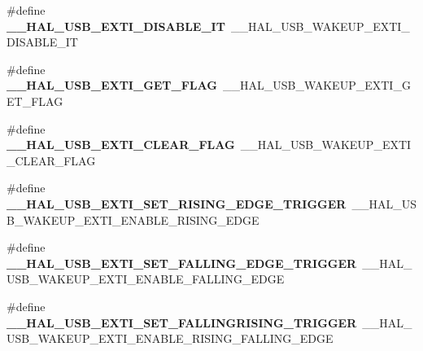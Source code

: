\begin{DoxyCompactItemize}
\item 
\#define {\bfseries \+\_\+\+\_\+\+H\+A\+L\+\_\+\+U\+S\+B\+\_\+\+E\+X\+T\+I\+\_\+\+D\+I\+S\+A\+B\+L\+E\+\_\+\+IT}~\+\_\+\+\_\+\+H\+A\+L\+\_\+\+U\+S\+B\+\_\+\+W\+A\+K\+E\+U\+P\+\_\+\+E\+X\+T\+I\+\_\+\+D\+I\+S\+A\+B\+L\+E\+\_\+\+IT\hypertarget{group___h_a_l___u_s_b___aliased___macros_ga9ae38cfb5026c3868e5d9e9325ab801c}{}\label{group___h_a_l___u_s_b___aliased___macros_ga9ae38cfb5026c3868e5d9e9325ab801c}

\item 
\#define {\bfseries \+\_\+\+\_\+\+H\+A\+L\+\_\+\+U\+S\+B\+\_\+\+E\+X\+T\+I\+\_\+\+G\+E\+T\+\_\+\+F\+L\+AG}~\+\_\+\+\_\+\+H\+A\+L\+\_\+\+U\+S\+B\+\_\+\+W\+A\+K\+E\+U\+P\+\_\+\+E\+X\+T\+I\+\_\+\+G\+E\+T\+\_\+\+F\+L\+AG\hypertarget{group___h_a_l___u_s_b___aliased___macros_ga6eac2b0cbade80df102638ce9eec5fff}{}\label{group___h_a_l___u_s_b___aliased___macros_ga6eac2b0cbade80df102638ce9eec5fff}

\item 
\#define {\bfseries \+\_\+\+\_\+\+H\+A\+L\+\_\+\+U\+S\+B\+\_\+\+E\+X\+T\+I\+\_\+\+C\+L\+E\+A\+R\+\_\+\+F\+L\+AG}~\+\_\+\+\_\+\+H\+A\+L\+\_\+\+U\+S\+B\+\_\+\+W\+A\+K\+E\+U\+P\+\_\+\+E\+X\+T\+I\+\_\+\+C\+L\+E\+A\+R\+\_\+\+F\+L\+AG\hypertarget{group___h_a_l___u_s_b___aliased___macros_gabaf7fe70f4008c0b9a81a0032b7b38fb}{}\label{group___h_a_l___u_s_b___aliased___macros_gabaf7fe70f4008c0b9a81a0032b7b38fb}

\item 
\#define {\bfseries \+\_\+\+\_\+\+H\+A\+L\+\_\+\+U\+S\+B\+\_\+\+E\+X\+T\+I\+\_\+\+S\+E\+T\+\_\+\+R\+I\+S\+I\+N\+G\+\_\+\+E\+D\+G\+E\+\_\+\+T\+R\+I\+G\+G\+ER}~\+\_\+\+\_\+\+H\+A\+L\+\_\+\+U\+S\+B\+\_\+\+W\+A\+K\+E\+U\+P\+\_\+\+E\+X\+T\+I\+\_\+\+E\+N\+A\+B\+L\+E\+\_\+\+R\+I\+S\+I\+N\+G\+\_\+\+E\+D\+GE\hypertarget{group___h_a_l___u_s_b___aliased___macros_gaef664a7c509860ae0f3a1abb427cf4f7}{}\label{group___h_a_l___u_s_b___aliased___macros_gaef664a7c509860ae0f3a1abb427cf4f7}

\item 
\#define {\bfseries \+\_\+\+\_\+\+H\+A\+L\+\_\+\+U\+S\+B\+\_\+\+E\+X\+T\+I\+\_\+\+S\+E\+T\+\_\+\+F\+A\+L\+L\+I\+N\+G\+\_\+\+E\+D\+G\+E\+\_\+\+T\+R\+I\+G\+G\+ER}~\+\_\+\+\_\+\+H\+A\+L\+\_\+\+U\+S\+B\+\_\+\+W\+A\+K\+E\+U\+P\+\_\+\+E\+X\+T\+I\+\_\+\+E\+N\+A\+B\+L\+E\+\_\+\+F\+A\+L\+L\+I\+N\+G\+\_\+\+E\+D\+GE\hypertarget{group___h_a_l___u_s_b___aliased___macros_ga852708fb3258bdc4b7d6b246d9ac32b9}{}\label{group___h_a_l___u_s_b___aliased___macros_ga852708fb3258bdc4b7d6b246d9ac32b9}

\item 
\#define {\bfseries \+\_\+\+\_\+\+H\+A\+L\+\_\+\+U\+S\+B\+\_\+\+E\+X\+T\+I\+\_\+\+S\+E\+T\+\_\+\+F\+A\+L\+L\+I\+N\+G\+R\+I\+S\+I\+N\+G\+\_\+\+T\+R\+I\+G\+G\+ER}~\+\_\+\+\_\+\+H\+A\+L\+\_\+\+U\+S\+B\+\_\+\+W\+A\+K\+E\+U\+P\+\_\+\+E\+X\+T\+I\+\_\+\+E\+N\+A\+B\+L\+E\+\_\+\+R\+I\+S\+I\+N\+G\+\_\+\+F\+A\+L\+L\+I\+N\+G\+\_\+\+E\+D\+GE\hypertarget{group___h_a_l___u_s_b___aliased___macros_gab88741810e4ac8773680c0cc6b948e37}{}\label{group___h_a_l___u_s_b___aliased___macros_gab88741810e4ac8773680c0cc6b948e37}


\end{DoxyCompactItemize}
